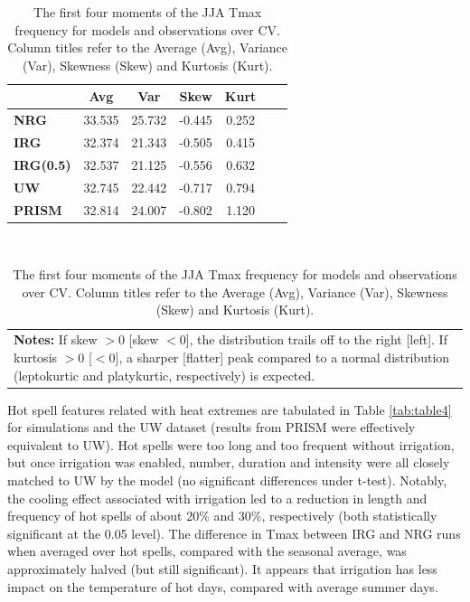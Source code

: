 \begin{table}
\begin{center}
\caption{The first four moments of the JJA Tmax frequency for models and observations over CV. Column titles refer to the Average (Avg), Variance (Var), Skewness (Skew) and Kurtosis (Kurt).} \label{tab:table3}
\begin{tabular*}{4in}{l @{\extracolsep{\fill}}cccccc}
\hline & Avg &Var & Skew & Kurt \\
\hline \textbf{NRG} & 33.535 & 25.732 & -0.445 & 0.252 \\
\textbf{IRG} & 32.374 & 21.343 & -0.505 & 0.415 \\
\textbf{IRG(0.5)} & 32.537 & 21.125 & -0.556 & 0.632 \\
\textbf{UW} & 32.745 & 22.442 & -0.717 & 0.794 \\
\textbf{PRISM} & 32.814 & 24.007 & -0.802 & 1.120 \\
\hline
\end{tabular*} \\

\begin{tabular}{p{3in}}
\small\textbf{Notes:} If skew $>0$ [skew $<0$], the distribution trails off to the right [left]. If kurtosis $> 0$ [$<0$], a sharper [flatter] peak compared to a normal distribution (leptokurtic and platykurtic, respectively) is expected.
\end{tabular}
\end{center}
\end{table}

Hot spell features related with heat extremes are tabulated in Table \ref{tab:table4} for simulations and the UW dataset (results from PRISM were effectively equivalent to UW). Hot spells were too long and too frequent without irrigation, but once irrigation was enabled, number, duration and intensity were all closely matched to UW by the model (no significant differences under t-test). Notably, the cooling effect associated with irrigation led to a reduction in length and frequency of hot spells of about 20$\%$ and 30$\%$, respectively (both statistically significant at the 0.05 level). The difference in Tmax between IRG and NRG runs when averaged over hot spells, compared with the seasonal average, was approximately halved (but still significant). It appears that irrigation has less impact on the temperature of hot days, compared with average summer days.

